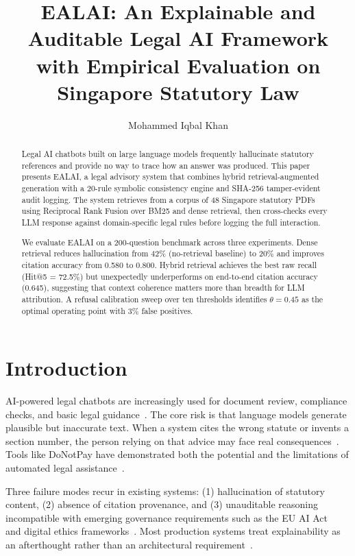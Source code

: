 \documentclass[runningheads]{llncs}
\title{EALAI: An Explainable and Auditable Legal AI Framework\\
with Empirical Evaluation on Singapore Statutory Law}
\author{Mohammed Iqbal Khan\inst{1}}
\institute{Department of Data Science and Engineering,\\
Manipal University Jaipur, India\\
\email{sheranidanish12@gmail.com}}
\let\oldsection\section
\renewcommand{\section}{\clearpage\oldsection}
\begin{document}
\maketitle

\begin{abstract}
Legal AI chatbots built on large language models frequently hallucinate statutory
references and provide no way to trace how an answer was produced. This paper presents
EALAI, a legal advisory system that combines hybrid retrieval-augmented generation
with a 20-rule symbolic consistency engine and SHA-256 tamper-evident audit logging.
The system retrieves from a corpus of 48 Singapore statutory PDFs using Reciprocal
Rank Fusion over BM25 and dense retrieval, then cross-checks every LLM response
against domain-specific legal rules before logging the full interaction.

We evaluate EALAI on a 200-question benchmark across three experiments. Dense
retrieval reduces hallucination from 42\% (no-retrieval baseline) to 20\% and
improves citation accuracy from 0.580 to 0.800. Hybrid retrieval achieves the best
raw recall (Hit@5 = 72.5\%) but unexpectedly underperforms on end-to-end citation
accuracy (0.645), suggesting that context coherence matters more than breadth for LLM
attribution. A refusal calibration sweep over ten thresholds identifies $\theta=0.45$
as the optimal operating point with 3\% false positives.

\end{abstract}

\section{Introduction}

AI-powered legal chatbots are increasingly used for document review, compliance
checks, and basic legal guidance~\cite{b2,b4}. The core risk is that language models
generate plausible but inaccurate text. When a system cites the wrong statute or
invents a section number, the person relying on that advice may face real
consequences~\cite{b1,b8}. Tools like DoNotPay have demonstrated both the potential
and the limitations of automated legal assistance~\cite{b3}.

Three failure modes recur in existing systems: (1) hallucination of statutory content,
(2) absence of citation provenance, and (3) unauditable reasoning incompatible with
emerging governance requirements such as the EU AI Act~\cite{b6} and digital ethics
frameworks~\cite{b5}. Most production systems treat explainability as an afterthought
rather than an architectural requirement~\cite{b7}.
\end{document}
